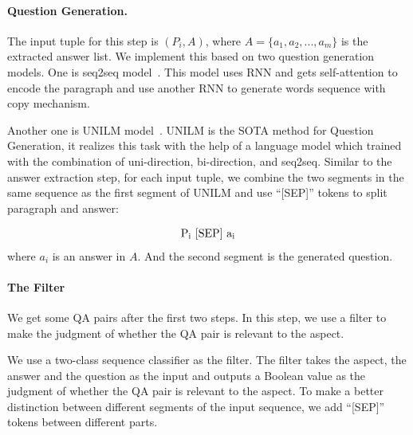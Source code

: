 \paragraph{Question Generation.} The input tuple for this step is $(P_i, A)$, where $A=\{a_1,a_2,...,a_m\}$ is the extracted answer list. We implement this based on two question generation models. One is seq2seq model~\cite{zhao2018paragraph}. This model uses RNN and gets self-attention to encode the paragraph and use another RNN to generate words sequence with copy mechanism. 

Another one is UNILM model~\cite{dong2019unified}. UNILM is the SOTA method for Question Generation, it realizes this task with the help of a language model which trained with the combination of uni-direction, bi-direction, and seq2seq. Similar to the answer extraction step, for each input tuple, we combine the two segments in the same sequence as the first segment of UNILM and use ``[SEP]'' tokens to split paragraph and answer:

\begin{equation*}
\begin{aligned}
{\rm P_i\ [SEP]\ a_i}\\
\end{aligned}
\end{equation*}
where $a_i$ is an answer in $A$. And the second segment is the generated question.

\paragraph{The Filter}
We get some QA pairs after the first two steps. In this step, we use a filter to make the judgment of whether the QA pair is relevant to the aspect. 

We use a two-class sequence classifier as the filter. 
The filter takes the aspect, the answer and the question as the input and outputs a Boolean value as the judgment of whether the QA pair is relevant to the aspect. 
To make a better distinction between different segments of the input sequence, we add ``[SEP]'' tokens between different parts.




